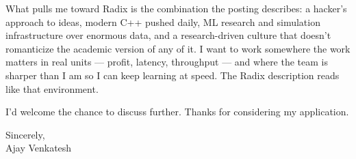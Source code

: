 \documentclass[letterpaper,11pt]{article}
\begin{document}
What pulls me toward Radix is the combination the posting describes: a hacker's approach to ideas, modern C++ pushed daily, ML research and simulation infrastructure over enormous data, and a research-driven culture that doesn't romanticize the academic version of any of it. I want to work somewhere the work matters in real units --- profit, latency, throughput --- and where the team is sharper than I am so I can keep learning at speed. The Radix description reads like that environment.

I'd welcome the chance to discuss further. Thanks for considering my application.

\vspace{12pt}

Sincerely, \\
Ajay Venkatesh
\end{document}

